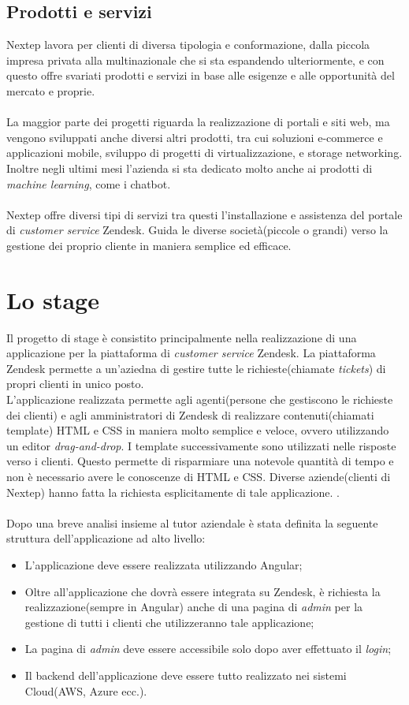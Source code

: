 \subsection{Prodotti e servizi}
Nextep lavora per clienti di diversa tipologia e conformazione, dalla piccola impresa
privata alla multinazionale che si sta espandendo ulteriormente, e con questo offre
svariati prodotti e servizi in base alle esigenze e alle opportunità del mercato e proprie. 
\\ \\La maggior parte dei progetti riguarda la realizzazione di portali e siti web, ma vengono
sviluppati anche diversi altri prodotti, tra cui soluzioni e-commerce e applicazioni
mobile, sviluppo di progetti di virtualizzazione, e storage networking. Inoltre negli ultimi mesi l'azienda si sta dedicato molto anche ai prodotti di \emph{machine learning}, come i chatbot. \\ \\Nextep offre diversi tipi di servizi tra questi l'installazione e assistenza del portale di \emph{customer service} Zendesk. Guida le diverse società(piccole o grandi) verso la gestione dei proprio cliente in maniera semplice ed efficace. 

\section{Lo stage}
Il progetto di stage è consistito principalmente nella realizzazione di una applicazione per la piattaforma di \emph{customer service} Zendesk. La piattaforma Zendesk permette a un'aziedna di gestire tutte le richieste(chiamate \emph{tickets}) di propri clienti in unico posto. \\ L'applicazione realizzata permette agli agenti(persone che gestiscono le richieste dei clienti) e agli amministratori di Zendesk di realizzare contenuti(chiamati template) HTML e CSS in maniera molto semplice e veloce, ovvero utilizzando un editor \emph{drag-and-drop}. I template successivamente sono utilizzati nelle risposte verso i clienti. Questo permette di risparmiare una notevole quantità di tempo e non è necessario avere le conoscenze di HTML e CSS. Diverse aziende(clienti di Nextep) hanno fatta la richiesta esplicitamente di tale applicazione. .
\\
\\
Dopo una breve analisi insieme al tutor aziendale è stata definita la seguente struttura dell'applicazione ad alto livello: 
\begin{itemize}
	\item L'applicazione deve essere realizzata utilizzando Angular; 
	\item Oltre all'applicazione che dovrà essere integrata su Zendesk, è richiesta la realizzazione(sempre in Angular) anche di una pagina di \emph{admin} per la gestione di tutti i clienti che utilizzeranno tale applicazione;
	\item La pagina di \emph{admin} deve essere accessibile solo dopo aver effettuato il \emph{login};
	\item Il backend dell'applicazione deve essere tutto realizzato nei sistemi Cloud(AWS, Azure ecc.).
\end{itemize} 

